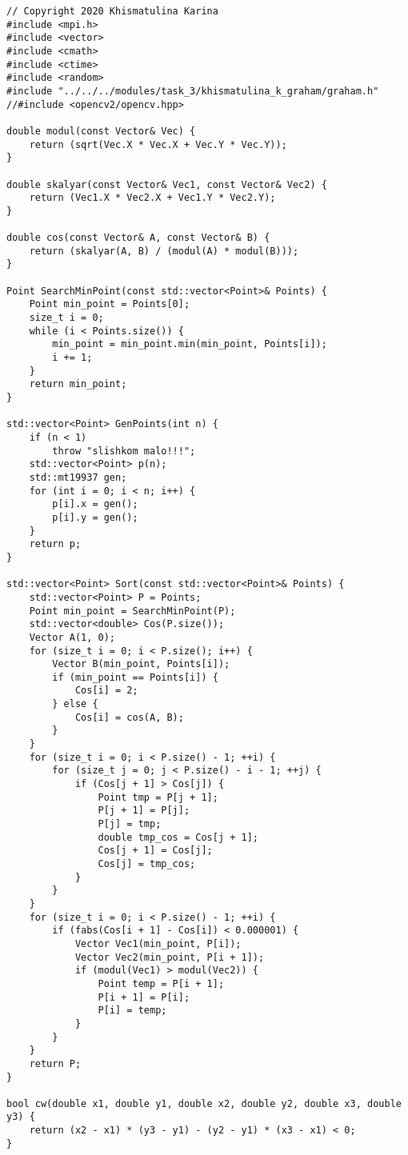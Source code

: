 \documentclass{report}
\begin{document}
\begin{lstlisting}
// Copyright 2020 Khismatulina Karina
#include <mpi.h>
#include <vector>
#include <cmath>
#include <ctime>
#include <random>
#include "../../../modules/task_3/khismatulina_k_graham/graham.h"
//#include <opencv2/opencv.hpp>

double modul(const Vector& Vec) {
    return (sqrt(Vec.X * Vec.X + Vec.Y * Vec.Y));
}

double skalyar(const Vector& Vec1, const Vector& Vec2) {
    return (Vec1.X * Vec2.X + Vec1.Y * Vec2.Y);
}

double cos(const Vector& A, const Vector& B) {
    return (skalyar(A, B) / (modul(A) * modul(B)));
}

Point SearchMinPoint(const std::vector<Point>& Points) {
    Point min_point = Points[0];
    size_t i = 0;
    while (i < Points.size()) {
        min_point = min_point.min(min_point, Points[i]);
        i += 1;
    }
    return min_point;
}

std::vector<Point> GenPoints(int n) {
    if (n < 1)
        throw "slishkom malo!!!";
    std::vector<Point> p(n);
    std::mt19937 gen;
    for (int i = 0; i < n; i++) {
        p[i].x = gen();
        p[i].y = gen();
    }
    return p;
}

std::vector<Point> Sort(const std::vector<Point>& Points) {
    std::vector<Point> P = Points;
    Point min_point = SearchMinPoint(P);
    std::vector<double> Cos(P.size());
    Vector A(1, 0);
    for (size_t i = 0; i < P.size(); i++) {
        Vector B(min_point, Points[i]);
        if (min_point == Points[i]) {
            Cos[i] = 2;
        } else {
            Cos[i] = cos(A, B);
        }
    }
    for (size_t i = 0; i < P.size() - 1; ++i) {
        for (size_t j = 0; j < P.size() - i - 1; ++j) {
            if (Cos[j + 1] > Cos[j]) {
                Point tmp = P[j + 1];
                P[j + 1] = P[j];
                P[j] = tmp;
                double tmp_cos = Cos[j + 1];
                Cos[j + 1] = Cos[j];
                Cos[j] = tmp_cos;
            }
        }
    }
    for (size_t i = 0; i < P.size() - 1; ++i) {
        if (fabs(Cos[i + 1] - Cos[i]) < 0.000001) {
            Vector Vec1(min_point, P[i]);
            Vector Vec2(min_point, P[i + 1]);
            if (modul(Vec1) > modul(Vec2)) {
                Point temp = P[i + 1];
                P[i + 1] = P[i];
                P[i] = temp;
            }
        }
    }
    return P;
}

bool cw(double x1, double y1, double x2, double y2, double x3, double y3) {
    return (x2 - x1) * (y3 - y1) - (y2 - y1) * (x3 - x1) < 0;
}


\end{lstlisting}
\end{document}
